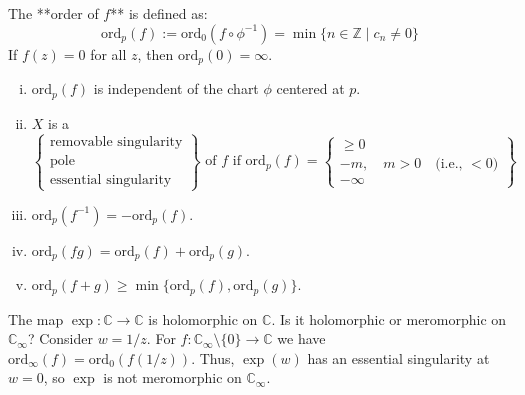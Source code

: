 \documentclass{article}
\begin{document}
\begin{definition}
The **order of $f$** is defined as:
$$
\text{ord}_p(f) := \text{ord}_0(f \circ \phi^{-1}) = \min \{n \in \mathbb{Z} \mid c_n \neq 0\}
$$
If $f(z) = 0$ for all $z$, then $\text{ord}_p(0) = \infty$.
\end{definition}

\begin{lemma}
\begin{enumerate}[i)]
    \item $\text{ord}_p(f)$ is independent of the chart $\phi$ centered at $p$.
    \item $X$ is a
    $$
    \left\{
    \begin{array}{l}
    \text{removable singularity} \\
    \text{pole} \\
    \text{essential singularity}
    \end{array}
    \right\} \text{ of } f \text{ if } \text{ord}_p(f) =
    \left\{
    \begin{array}{l}
    \geq 0 \\
    -m, \quad m > 0 \quad \text{(i.e., } < 0 \text{)} \\
    -\infty
    \end{array}
    \right\}
    $$
    \item $\text{ord}_p(f^{-1}) = -\text{ord}_p(f)$.
    \item $\text{ord}_p(f g) = \text{ord}_p(f) + \text{ord}_p(g)$.
    \item $\text{ord}_p(f+g) \geq \min \{ \text{ord}_p(f), \text{ord}_p(g) \}$.
\end{enumerate}
\end{lemma}

\begin{example}
The map $\exp: \mathbb{C} \to \mathbb{C}$ is holomorphic on $\mathbb{C}$. Is it holomorphic or meromorphic on $\mathbb{C}_{\infty}$?
Consider $w=1/z$. For $f: \mathbb{C}_{\infty} \setminus \{0\} \to \mathbb{C}$ we have $\text{ord}_{\infty}(f) = \text{ord}_0(f(1/z))$.
Thus, $\exp(w)$ has an essential singularity at $w=0$, so $\exp$ is not meromorphic on $\mathbb{C}_{\infty}$.
\end{example}
\end{document}

